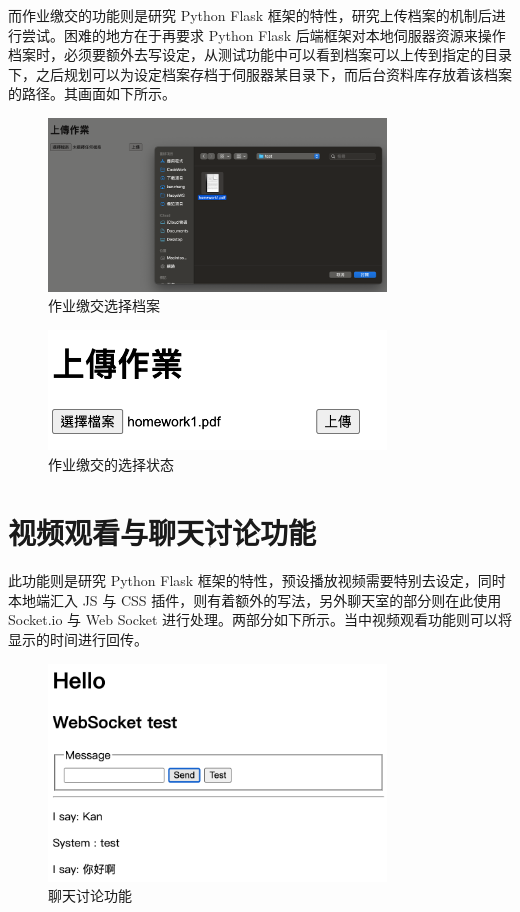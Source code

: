 而作业缴交的功能则是研究 Python Flask  框架的特性，研究上传档案的机制后进行尝试。困难的地方在于再要求 Python Flask 后端框架对本地伺服器资源来操作档案时，必须要额外去写设定，从测试功能中可以看到档案可以上传到指定的目录下，之后规划可以为设定档案存档于伺服器某目录下，而后台资料库存放着该档案的路径。其画面如下所示。

\begin{figure}[htb]
\centering 
\includegraphics[width=0.80\textwidth]{img/demo-file-sys-0.png} 
\caption{作业缴交选择档案}
\label{Test}
\end{figure}

\begin{figure}[htb]
\centering 
\includegraphics[width=0.80\textwidth]{img/demo-file-sys-1.png} 
\caption{作业缴交的选择状态}
\label{Test}
\end{figure}

\section{视频观看与聊天讨论功能}

此功能则是研究 Python Flask 框架的特性，预设播放视频需要特别去设定，同时本地端汇入 JS 与 CSS 插件，则有着额外的写法，另外聊天室的部分则在此使用 Socket.io 与 Web Socket 进行处理。两部分如下所示。当中视频观看功能则可以将显示的时间进行回传。

\begin{figure}[htb]
\centering 
\includegraphics[width=0.80\textwidth]{img/demo-chat-sys.png} 
\caption{聊天讨论功能}
\label{Test}
\end{figure}


